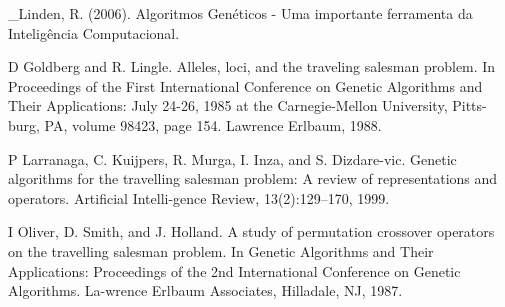 \documentclass[twoside]{article}
\begin{document}
\begin{multicols}{2}
\begin{thebibliography}{99}
\bibitem _Linden, R. (2006).  Algoritmos Genéticos - Uma importante ferramenta da Inteligência Computacional.

\bibitem D Goldberg and R. Lingle. Alleles, loci, and the traveling salesman problem. In Proceedings of the First International Conference on Genetic Algorithms and Their Applications: July 24-26, 1985 at the Carnegie-Mellon University, Pitts-burg, PA, volume 98423, page 154. Lawrence Erlbaum, 1988.
 
\bibitem P Larranaga, C. Kuijpers, R. Murga, I. Inza, and S. Dizdare-vic. Genetic algorithms for the travelling salesman problem: A review of representations and operators. Artificial Intelli-gence Review, 13(2):129–170, 1999.

\bibitem I Oliver, D. Smith, and J. Holland. A study of permutation
crossover operators on the travelling salesman problem. In
Genetic Algorithms and Their Applications: Proceedings of
the 2nd International Conference on Genetic Algorithms. La-wrence Erlbaum Associates, Hilladale, NJ, 1987.
 
\end{thebibliography}


\end{multicols}
\end{document}
